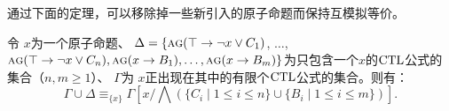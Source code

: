 
通过下面的定理，可以移除掉一些新引入的原子命题而保持互模拟等价。

\begin{lemma} \label{thm:Aclm}
	令 $x$为一个原子命题、 
	$\Delta = \{\textsc{a}\textsc{g}(\top \rightarrow \neg x \vee C_1)$, $\dots$, $\textsc{a}\textsc{g}(\top \rightarrow \neg x \vee C_n), \textsc{a}\textsc{g}(x \rightarrow B_1), \dots, \textsc{a}\textsc{g}(x \rightarrow B_m)\}$为只包含一个$x$的$\textrm{CTL}$公式的集合（$n, m \geq 1$）、
	$\Gamma$为 $x$正出现在其中的有限个$\textrm{CTL}$公式的集合。则有：
	\begin{equation}\label{eq:Ackermann:lemma}
		\Gamma\cup \Delta \equiv_{\{x\}}  
		\Gamma\left[x/\bigwedge\left(\{C_i\mid 1\le i\le n\}\cup\{B_i\mid 1\le i\le m\}\right)\right].
	\end{equation}
\end{lemma}
